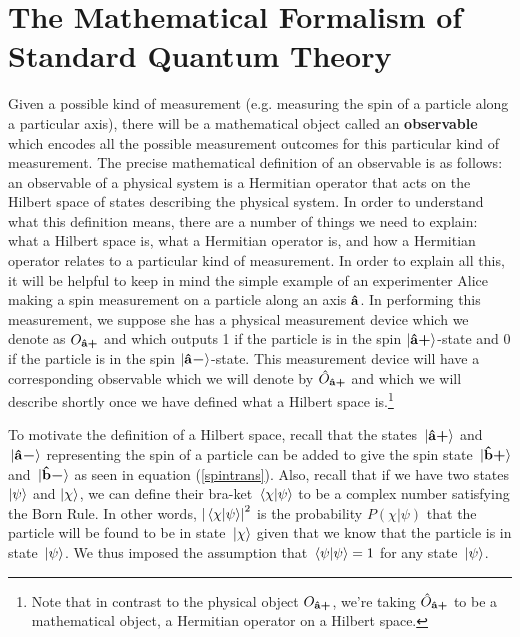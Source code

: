 \section{The Mathematical Formalism of Standard Quantum Theory}
Given a possible kind of measurement (e.g. measuring the spin of a particle along a particular axis), there will be a mathematical object called an \textbf{observable} which encodes all the possible measurement outcomes for this particular kind of measurement. The precise mathematical definition of an observable is as follows: an observable of a physical system is a Hermitian operator that acts on the Hilbert space of states describing the physical system. In order to understand what this definition means, there are a number of things we need to explain: what a Hilbert space is, what a Hermitian operator is, and how a Hermitian operator relates to a particular kind of measurement. In order to explain all this, it will be helpful to keep in mind the simple example of an experimenter Alice making a spin measurement on a particle along an axis $\vb{\hat{{a}}}$. In performing this measurement, we suppose she has a physical measurement device which we denote as $O_{{\vb{\hat{{a}}}\bm{+}}}$ %
%
and which outputs 1 if the particle is in the spin $\ket{{\vb{\hat{{a}}}\bm{+}}}$-state and 0 if the particle is in the spin $\ket{{\vb{\hat{{a}}}\bm{-}}}$-state. This measurement device will have a corresponding observable which we will denote by $\hat{O}_{{\vb{\hat{{a}}}\bm{+}}}$ %
%
and which we will describe shortly once we have defined what a Hilbert space is.\footnote{Note that in contrast to the physical object $O_{{\vb{\hat{{a}}}\bm{+}}}$, we're taking $\hat{O}_{{\vb{\hat{{a}}}\bm{+}}}$ to be a mathematical object, a Hermitian operator on a Hilbert space.} 

To motivate the definition of a Hilbert space, recall that the states $\ket*{{\vb{\hat{{a}}}\bm{+}}}$ and $\ket*{{\vb{\hat{{a}}}\bm{-}}}$ representing the spin of  a particle can be added to give the spin state $\ket*{{\vb{\hat{{b}}}\bm{+}}}$ and $\ket*{{\vb{\hat{{b}}}\bm{-}}}$ as seen in equation (\ref{spintrans}). Also, recall that if we have two states $\ket{\psi}$ and $\ket{\chi}$, we can define their bra-ket $\ip*{\chi}{\psi}$ to be a complex number satisfying the Born Rule. In other words, $\abs{\ip*{\chi}{\psi}}^2$ is the probability $P(\chi|\psi)$ that the particle will be found to be in state $\ket*{\chi}$ given that we know that the particle is in state $\ket*{\psi}$. We thus imposed the assumption that  $\ip*{\psi}{\psi}=1$ for any state $\ket*{\psi}$. 

